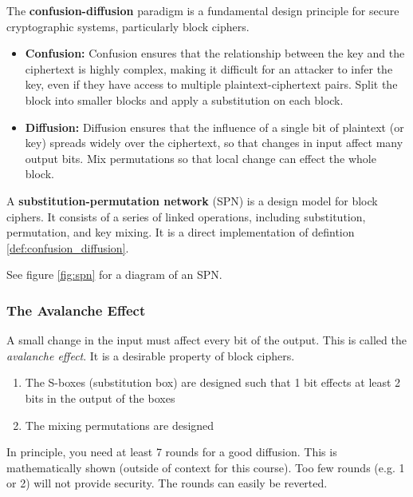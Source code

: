 \begin{defn}
    The \textbf{confusion-diffusion} paradigm is a fundamental design principle for secure cryptographic systems, particularly block ciphers.
    \begin{itemize}
        \item \textbf{Confusion:} Confusion ensures that the relationship between the key and the ciphertext is highly complex, making it difficult for an attacker to infer the key, even if they have access to multiple plaintext-ciphertext pairs. Split the block into smaller blocks and apply a
        substitution on each block.
        \item \textbf{Diffusion:} Diffusion ensures that the influence of a single bit of plaintext (or key) spreads widely over the ciphertext, so that changes in input affect many output bits.  Mix permutations so that local change can effect the
        whole block.
    \end{itemize}
\end{defn} \label{def:confusion_diffusion}

\begin{defn}
    A \textbf{substitution-permutation network} (SPN) is a design model for block ciphers. It consists of a series of linked operations, including substitution, permutation, and key mixing. It is a direct implementation of defintion \ref{def:confusion_diffusion}. 
\end{defn}
See figure \ref{fig:spn} for a diagram of an SPN.

\subsubsection{The Avalanche Effect}
A small change in the input must affect every bit of the output. This is called the \emph{avalanche effect}. It is a desirable property of block ciphers.
\begin{enumerate}
    \item The S-boxes (substitution box) are designed such that 1 bit effects at least 2 bits in the output of the boxes
    \item The mixing permutations are designed
\end{enumerate}

In principle, you need at least 7 rounds for a good diffusion. This is mathematically shown (outside of context for this course). Too few rounds (e.g. 1 or 2) will not provide security. The rounds can easily be reverted. 

